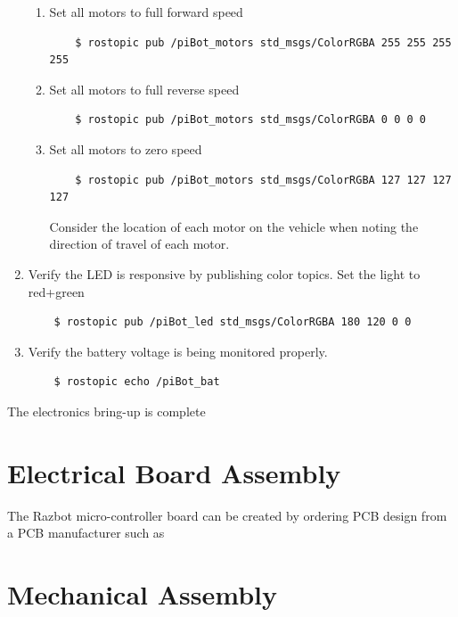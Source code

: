 \documentclass[12pt,titlepage,oneside]{memoir}
\begin{document}
\begin{enumerate}
\begin{enumerate}
	\item Set all motors to full forward speed
	\begin{verbatim}
	$ rostopic pub /piBot_motors std_msgs/ColorRGBA 255 255 255 255
	\end{verbatim}
	\item Set all motors to full reverse speed
	\begin{verbatim}
	$ rostopic pub /piBot_motors std_msgs/ColorRGBA 0 0 0 0
	\end{verbatim}
	\item Set all motors to zero speed
	\begin{verbatim}
	$ rostopic pub /piBot_motors std_msgs/ColorRGBA 127 127 127 127
	\end{verbatim}
	Consider the location of each motor on the vehicle when noting the direction of travel of each
 motor.
 	\end{enumerate}
 	\item Verify the LED is responsive by publishing color topics. Set the light to red+green
 	\begin{verbatim}
 	$ rostopic pub /piBot_led std_msgs/ColorRGBA 180 120 0 0
 	\end{verbatim}
 	\item Verify the battery voltage is being monitored properly.
 	\begin{verbatim}
 	$ rostopic echo /piBot_bat
 	\end{verbatim}
\end{enumerate}
The electronics bring-up is complete

\section{Electrical Board Assembly}

The Razbot micro-controller board can be created by ordering PCB design from a PCB manufacturer such as 

\section{Mechanical Assembly}
\end{document}
